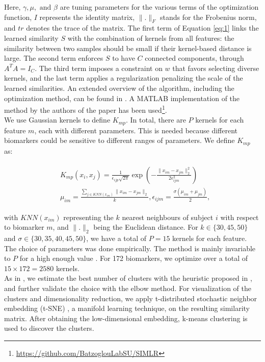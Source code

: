 Here, $\gamma, \mu, \text{ and } \beta$ are tuning parameters for the various terms of the optimization function, $I$ represents the identity matrix, $\| . \|_F$ stands for the Frobenius norm, and $tr$ denotes the trace of the matrix. The first term of Equation \ref{eq:1} links the learned similarity $S$ with the combination of kernels from all features: the similarity between two samples should be small if their kernel-based distance is large. The second term enforces $S$ to have $C$ connected components, through $A^TA = I_C$. The third term imposes a constraint on $w$ that favors selecting diverse kernels, and the last term applies a regularization penalizing the scale of the learned similarities. An extended overview of the algorithm, including the optimization method, can be found in \cite{Ramazzotti2018}. A MATLAB implementation of the method by the authors of the paper has been used\footnote{\url{https://github.com/BatzoglouLabSU/SIMLR}}. \\

We use Gaussian kernels to define $K_{mp}$. In total, there are $P$ kernels for each feature $m$, each with different parameters. This is needed because different biomarkers could be sensitive to different ranges of parameters. We define $K_{mp}$ as:

\begin{align}
\begin{split}\label{eq:2}
{}&K_{mp}(x_i,x_j) = \frac{1}{\epsilon_{ijp}\sqrt{2\pi}} \exp \left( -\frac{\| x_{im} - x_{jm} \|^2_2}{2\epsilon_{ijm}^2}  \right) \\
{}&\mu_{im} = \frac{\sum_{j \in KNN(x_{im})} \| x_{im} - x_{jm} \|_2}{k}, \epsilon_{ijm}=\frac{\sigma(\mu_{im} + \mu_{jm})}{2},
\end{split}
\end{align}

with $KNN(x_{im})$ representing the $k$ nearest neighbours of subject $i$ with respect to biomarker $m$, and $\| .\|_2$ being the Euclidean distance. For $k\in \{30,45,50\}$ and $\sigma \in \{30,35,40,45,50\}$, we have a total of $P=15$ kernels for each feature. The choice of parameters was done empirically. The method is mainly invariable to $P$ for a high enough value \cite{Wang2017a}. For 172 biomarkers, we optimize over a total of $15\times 172=2580$ kernels. \\

As in \cite{Ramazzotti2018}, we estimate the best number of clusters with the heuristic proposed in \cite{Zelnik-Manor}, and further validate the choice with the elbow method. For visualization of the clusters and dimensionality reduction, we apply t-distributed stochastic neighbor embedding (t-SNE) \cite{VanDerMaaten2008}, a manifold learning technique, on the resulting similarity matrix. After obtaining the low-dimensional embedding, k-means clustering is used to discover the clusters. \\

